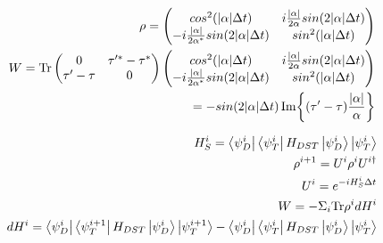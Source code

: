 \documentclass{article}
\begin{document}
\begin{align*}
		\rho = \begin{pmatrix}
		cos^2(\abs{\alpha} \Delta t) & i\frac{\abs{\alpha}}{2\alpha} sin(2\abs{\alpha} \Delta t) \\
		-i\frac{\abs{\alpha}}{2\alpha^*} sin(2\abs{\alpha} \Delta t) & sin^2(\abs{\alpha} \Delta t)
		\end{pmatrix} \\
		W = \mathrm{Tr} \begin{pmatrix}
		0 & \tau'^* - \tau^* \\
		\tau' - \tau & 0 \\
		\end{pmatrix}
		\begin{pmatrix}
		cos^2(\abs{\alpha} \Delta t) & i\frac{\abs{\alpha}}{2\alpha} sin(2\abs{\alpha} \Delta t) \\
		-i\frac{\abs{\alpha}}{2\alpha^*} sin(2\abs{\alpha} \Delta t) & sin^2(\abs{\alpha} \Delta t)
		\end{pmatrix} \\
		= -sin(2\abs{\alpha}\Delta t) \Im{(\tau' - \tau)\frac{\abs{\alpha}}{\alpha}}
	\end{align*}
	
	\begin{align*}
		H_S^i = \bra{\psi_D^i}\bra{\psi_T^i} H_{DST} \ket{\psi_D^i} \ket{\psi_T^i} \\
		\rho^{i+1} = U^i \rho^i U^{i\dagger} \\
		U^i = e^{-iH_S^i \Delta t} \\
		W = - \Sigma_i \mathrm{Tr} \rho^i dH^i \\
		dH^i = \bra{\psi_D^i}\bra{\psi_T^{i+1}} H_{DST} \ket{\psi_D^i} \ket{\psi_T^{i+1}} - \bra{\psi_D^i}\bra{\psi_T^i} H_{DST} \ket{\psi_D^i} \ket{\psi_T^i}
	\end{align*}
\end{document}
